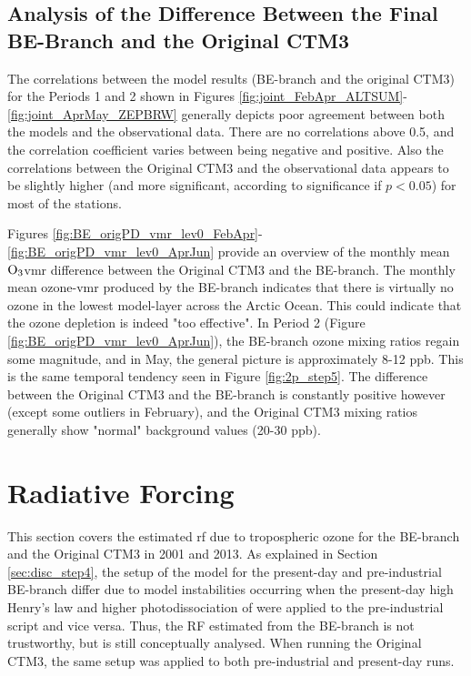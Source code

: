 \subsection{Analysis of the Difference Between the Final BE-Branch and the Original CTM3}\label{sec:disc_origBE}

The correlations between the model results (BE-branch and the original CTM3) for the Periods 1 and 2 shown in Figures \ref{fig:joint_FebApr_ALTSUM}-\ref{fig:joint_AprMay_ZEPBRW} generally depicts poor agreement between both the models and the observational data. There are no correlations above 0.5, and the correlation coefficient varies between being negative and positive. Also the correlations between the Original CTM3 and the observational data appears to be slightly higher (and more significant, according to significance if $p<0.05$) for most of the stations. 

\medskip

Figures \ref{fig:BE_origPD_vmr_lev0_FebApr}-\ref{fig:BE_origPD_vmr_lev0_AprJun} provide an overview of the monthly mean $\mathrm{O_3}$\acrshort{vmr} difference between the Original CTM3 and the BE-branch. The monthly mean ozone-\acrshort{vmr} produced by the BE-branch indicates that there is virtually no ozone in the lowest model-layer across the Arctic Ocean. This could indicate that the ozone depletion is indeed "too effective". In Period 2 (Figure \ref{fig:BE_origPD_vmr_lev0_AprJun}), the BE-branch ozone mixing ratios regain some magnitude, and in May, the general picture is approximately 8-12 ppb. This is the same temporal tendency seen in Figure \ref{fig:2p_step5}. The difference between the Original CTM3 and the BE-branch is constantly positive however (except some outliers in February), and the Original CTM3 mixing ratios generally show "normal" background values (20-30 ppb). 

\section{Radiative Forcing}\label{sec:disc_RF}

This section covers the estimated \acrlong{rf} due to tropospheric ozone for the BE-branch and the Original CTM3 in 2001 and 2013. As explained in Section \ref{sec:disc_step4}, the setup of the model for the present-day and pre-industrial BE-branch differ due to model instabilities occurring when the present-day high Henry's law and higher photodissociation of  were applied to the pre-industrial script and vice versa. Thus, the RF estimated from the BE-branch is not trustworthy, but is still conceptually analysed. When running the Original CTM3, the same setup was applied to both pre-industrial and present-day runs. 

